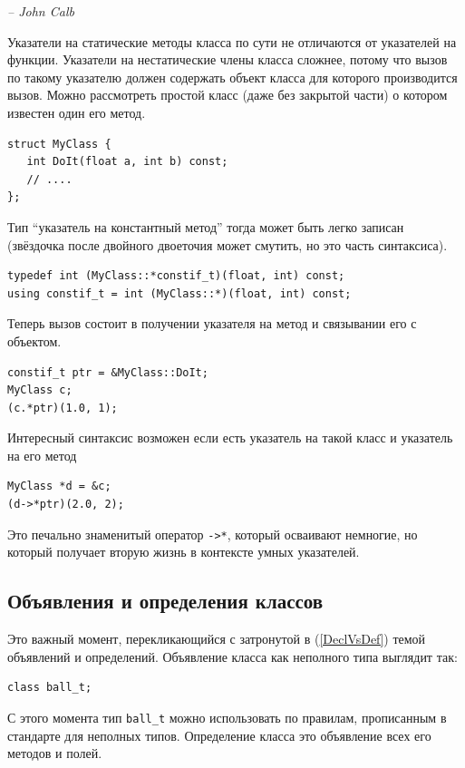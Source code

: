 \documentclass[a4paper,12pt,oneside]{book}
\begin{document}
\hfill\textit{-- John Calb}

Указатели на статические методы класса по сути не отличаются от указателей на функции. Указатели на нестатические члены класса сложнее, потому что вызов по такому указателю должен содержать объект класса для которого производится вызов. Можно рассмотреть простой класс (даже без закрытой части) о котором известен один его метод.

\begin{lstlisting}
struct MyClass {
   int DoIt(float a, int b) const;
   // ....
};
\end{lstlisting}

Тип ``указатель на константный метод'' тогда может быть легко записан (звёздочка после двойного двоеточия может смутить, но это часть синтаксиса).

\begin{lstlisting}
typedef int (MyClass::*constif_t)(float, int) const;
using constif_t = int (MyClass::*)(float, int) const;
\end{lstlisting}

Теперь вызов состоит в получении указателя на метод и связывании его с объектом.

\begin{lstlisting}
constif_t ptr = &MyClass::DoIt;
MyClass c;
(c.*ptr)(1.0, 1);
\end{lstlisting}

Интересный синтаксис возможен если есть указатель на такой класс и указатель на его метод

\begin{lstlisting}
MyClass *d = &c;
(d->*ptr)(2.0, 2);
\end{lstlisting}

Это печально знаменитый оператор \lstinline!->*!, который осваивают немногие, но который получает вторую жизнь в контексте умных указателей.

\subsection{Объявления и определения классов}\label{DeclDefs}

Это важный момент, перекликающийся с затронутой в (\ref{DeclVsDef}) темой объявлений и определений. Объявление класса как неполного типа выглядит так:

\begin{lstlisting}
class ball_t;
\end{lstlisting}

С этого момента тип \lstinline!ball_t! можно использовать по правилам, прописанным в стандарте для неполных типов. Определение класса это объявление всех его методов и полей.
\end{document}
